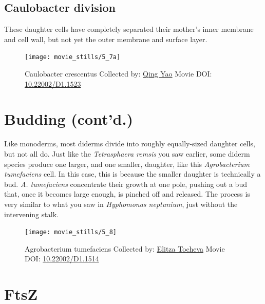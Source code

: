 \documentclass[]{tufte-book}
\begin{document}
\hypertarget{Caulobacter_division}{\subsection{Caulobacter
division}\label{Caulobacter_division}}

These daughter cells have completely separated their mother's inner
membrane and cell wall, but not yet the outer membrane and surface
layer.





\begin{figure}
\texttt{[image: movie\_stills/5\_7a]} \caption[Caulobacter crescentus Collected by:
\protect\hyperlink{qing_yao}{Qing Yao} Movie DOI:
\href{https://doi.org/10.22002/D1.1523}{10.22002/D1.1523}]{Caulobacter crescentus Collected by:
\protect\hyperlink{qing_yao}{Qing Yao} Movie DOI:
\href{https://doi.org/10.22002/D1.1523}{10.22002/D1.1523}}\label{fig:5-7a}
\end{figure}

\section{Budding (cont'd.)}\label{budding-contd.}

Like monoderms, most diderms divide into roughly equally-sized daughter
cells, but not all do. Just like the \emph{Tetrasphaera remsis} you saw
earlier, some diderm species produce one larger, and one smaller,
daughter, like this \emph{Agrobacterium tumefaciens} cell. In this case,
this is because the smaller daughter is technically a bud. \emph{A.
tumefaciens} concentrate their growth at one pole, pushing out a bud
that, once it becomes large enough, is pinched off and released. The
process is very similar to what you saw in \emph{Hyphomonas neptunium},
just without the intervening stalk.





\begin{figure}
\texttt{[image: movie\_stills/5\_8]} \caption[Agrobacterium tumefaciens Collected by:
\protect\hyperlink{elitza_tocheva}{Elitza Tocheva} Movie DOI:
\href{https://doi.org/10.22002/D1.1514}{10.22002/D1.1514}]{Agrobacterium tumefaciens Collected by:
\protect\hyperlink{elitza_tocheva}{Elitza Tocheva} Movie DOI:
\href{https://doi.org/10.22002/D1.1514}{10.22002/D1.1514}}\label{fig:5-8}
\end{figure}

\section{FtsZ}\label{ftsz}
\end{document}
